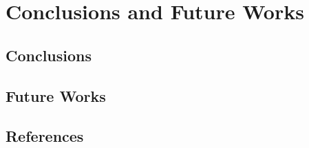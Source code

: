 \chapter{Conclusions and Future Works}
\section{Conclusions}
\section{Future Works}
\section{References}
  
